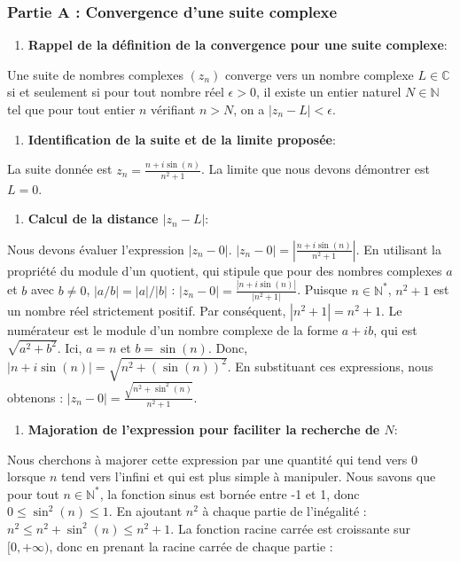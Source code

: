 \documentclass[a4paper,11pt]{report}
\begin{document}
\subsubsection*{Partie A : Convergence d'une suite complexe}
\begin{enumerate}
\item \textbf{Rappel de la définition de la convergence pour une suite complexe}:
\end{enumerate}
    Une suite de nombres complexes $(z_n)$ converge vers un nombre complexe $L \in \mathbb{C}$ si et seulement si pour tout nombre réel $\epsilon > 0$, il existe un entier naturel $N \in \mathbb{N}$ tel que pour tout entier $n$ vérifiant $n > N$, on a $|z_n - L| < \epsilon$.
\begin{enumerate}
\item \textbf{Identification de la suite et de la limite proposée}:
\end{enumerate}
    La suite donnée est $z_n = \frac{n + i \sin(n)}{n^2+1}$. La limite que nous devons démontrer est $L=0$.
\begin{enumerate}
\item \textbf{Calcul de la distance $|z_n - L|$}:
\end{enumerate}
    Nous devons évaluer l'expression $|z_n - 0|$.
    $|z_n - 0| = \left| \frac{n + i \sin(n)}{n^2+1} \right|$.
    En utilisant la propriété du module d'un quotient, qui stipule que pour des nombres complexes $a$ et $b$ avec $b \ne 0$, $|a/b| = |a|/|b|$ :
    $|z_n - 0| = \frac{|n + i \sin(n)|}{|n^2+1|}$.
    Puisque $n \in \mathbb{N}^*$, $n^2+1$ est un nombre réel strictement positif. Par conséquent, $|n^2+1| = n^2+1$.
    Le numérateur est le module d'un nombre complexe de la forme $a+ib$, qui est $\sqrt{a^2+b^2}$. Ici, $a=n$ et $b=\sin(n)$.
    Donc, $|n + i \sin(n)| = \sqrt{n^2 + (\sin(n))^2}$.
    En substituant ces expressions, nous obtenons :
    $|z_n - 0| = \frac{\sqrt{n^2 + \sin^2(n)}}{n^2+1}$.
\begin{enumerate}
\item \textbf{Majoration de l'expression pour faciliter la recherche de $N$}:
\end{enumerate}
    Nous cherchons à majorer cette expression par une quantité qui tend vers 0 lorsque $n$ tend vers l'infini et qui est plus simple à manipuler.
    Nous savons que pour tout $n \in \mathbb{N}^*$, la fonction sinus est bornée entre -1 et 1, donc $0 \le \sin^2(n) \le 1$.
    En ajoutant $n^2$ à chaque partie de l'inégalité :
    $n^2 \le n^2 + \sin^2(n) \le n^2+1$.
    La fonction racine carrée est croissante sur $[0, +\infty)$, donc en prenant la racine carrée de chaque partie :
\end{document}
